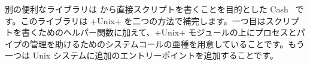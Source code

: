 別の便利なライブラリは \ocaml から直接スクリプトを書くことを目的とした Cash~\cite{Cash} です。このライブラリは \ml+Unix+ を二つの方法で補完します。一つ目はスクリプトを書くためのヘルパー関数に加えて、\ml+Unix+ モジュールの上にプロセスとパイプの管理を助けるためのシステムコールの亜種を用意していることです。もう一つは Unix システムに追加のエントリーポイントを追加することです。
